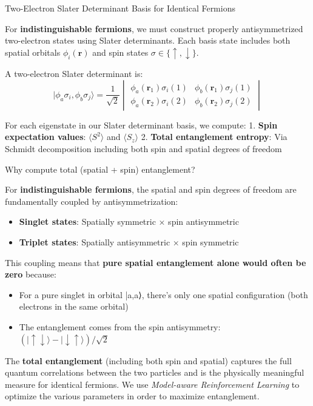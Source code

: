 \documentclass[aspectratio=169,10pt]{beamer}
\begin{document}
\begin{frame}{Two-Electron Slater Determinant Basis for Identical Fermions}

For \textbf{indistinguishable fermions}, we must construct properly antisymmetrized two-electron states using Slater determinants. Each basis state includes both spatial orbitals $\phi_i(\mathbf{r})$ and spin states $\sigma \in \{\uparrow, \downarrow\}$.

A two-electron Slater determinant is:
$$|\phi_a\sigma_i, \phi_b\sigma_j\rangle = \frac{1}{\sqrt{2}}\begin{vmatrix} \phi_a(\mathbf{r}_1)\sigma_i(1) & \phi_b(\mathbf{r}_1)\sigma_j(1) \\ \phi_a(\mathbf{r}_2)\sigma_i(2) & \phi_b(\mathbf{r}_2)\sigma_j(2) \end{vmatrix}$$

For each eigenstate in our Slater determinant basis, we compute:
1. \textbf{Spin expectation values}: $\langle S^2 \rangle$ and $\langle S_z \rangle$
2. \textbf{Total entanglement entropy}: Via Schmidt decomposition including both spin and spatial degrees of freedom

\end{frame}

\begin{frame}{Why compute total (spatial + spin) entanglement?}

For \textbf{indistinguishable fermions}, the spatial and spin degrees of freedom are fundamentally coupled by antisymmetrization:
\begin{itemize}
\item \textbf{Singlet states}: Spatially symmetric × spin antisymmetric
\item \textbf{Triplet states}: Spatially antisymmetric × spin symmetric
\end{itemize}
This coupling means that \textbf{pure spatial entanglement alone would often be zero} because:
\begin{itemize}
\item For a pure singlet in orbital |a,a⟩, there's only one spatial configuration (both electrons in the same orbital)
\item The entanglement comes from the spin antisymmetry: $(|\uparrow\downarrow\rangle - |\downarrow\uparrow\rangle)/\sqrt{2}$
\end{itemize}
The \textbf{total entanglement} (including both spin and spatial) captures the full quantum correlations between the two particles and is the physically meaningful measure for identical fermions.  We use {\em Model-aware Reinforcement Learning} to optimize the various parameters in order to maximize entanglement.

\end{frame}
\end{document}
